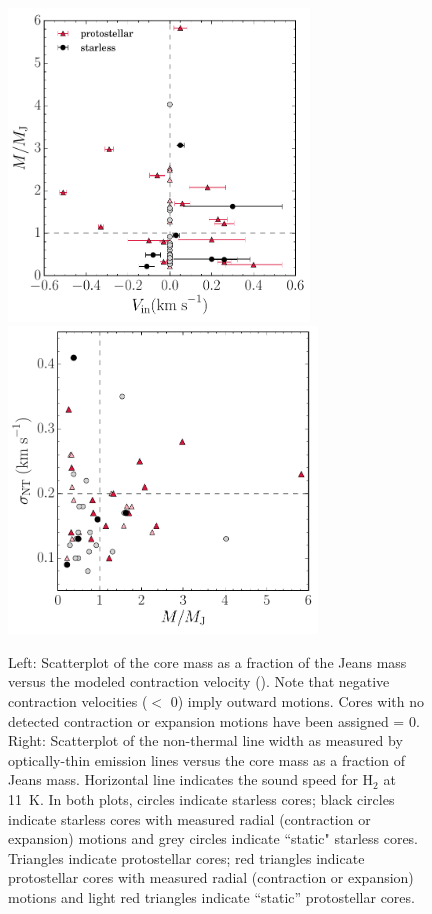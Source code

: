 \documentclass[iop,twocolappendix]{emulateapj}
\begin{document}
\begin{figure}
\begin{center}
\includegraphics[width=8cm]{mmCorrelations_JeansOnly.pdf} \includegraphics[width=8.2cm]{lineWidths.pdf}
\caption{Left: Scatterplot of the core mass as a fraction of the Jeans mass versus the modeled contraction velocity ({\Vin}). Note that negative contraction velocities ({\Vin}$ < $ 0) imply outward motions. Cores with no detected contraction or expansion motions have been assigned {\Vin} = 0. 
%
Right: Scatterplot of the non-thermal line width as measured by optically-thin {\ammonia} emission lines versus the core mass as a fraction of Jeans mass.
Horizontal line indicates the sound speed for H$_2$ at 11~K.
%
In both plots, circles indicate starless cores; black circles indicate starless cores with measured radial (contraction or expansion) motions and grey circles indicate ``static" starless cores. 
%
Triangles indicate protostellar cores; red triangles indicate protostellar cores with measured radial (contraction or expansion) motions and light red triangles indicate ``static'' protostellar cores.}
\label{fig:mmcorrelations}
\end{center}
\end{figure}
\end{document}

